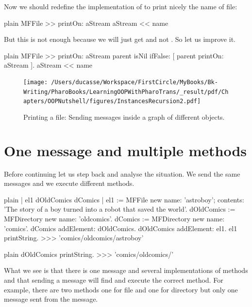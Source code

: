\documentclass[10pt,twoside,english]{_support/latex/sbabook/sbabook}
\begin{document}
Now we should redefine the implementation of  to print nicely the name of file:

\begin{displaycode}{plain}
MFFile >> printOn: aStream
	aStream << name
\end{displaycode}

But this is not enough because we will just get  and not .
So let us improve it.

\begin{displaycode}{plain}
MFFile >> printOn: aStream
	parent isNil ifFalse: [ 
		parent printOn: aStream ].
	aStream << name
\end{displaycode}


\begin{figure}

\begin{center}
\texttt{[image: /Users/ducasse/Workspace/FirstCircle/MyBooks/Bk-Writing/PharoBooks/LearningOOPWithPharoTrans/\_result/pdf/Chapters/OOPNutshell/figures/InstancesRecursion2.pdf]}\caption{Printing a file: Sending messages inside a graph of different objects. \label{InstancesRecursion2}}\end{center}
\end{figure}

\section{One message and multiple methods}
Before continuing let us step back and analyse the situation. We send the same messages and we execute different methods. 

\begin{displaycode}{plain}
| el1 dOldComics dComics |
el1 := MFFile new name: 'astroboy'; contents: 'The story of a boy turned into a robot that saved the world'.
dOldComics := MFDirectory new name: 'oldcomics'.
dComics := MFDirectory new name: 'comics'.
dComics addElement: dOldComics.
dOldComics addElement: el1. 
el1 printString.
>>>
'comics/oldcomics/astroboy'
\end{displaycode}

\begin{displaycode}{plain}
dOldComics printString.
>>>
'comics/oldcomics/'
\end{displaycode}

What we see is that there is one message and several implementations of methods and that sending a message will find and execute the correct method. For example, there are two methods  one for file and one for directory but only one message  sent from the  message.
\end{document}
